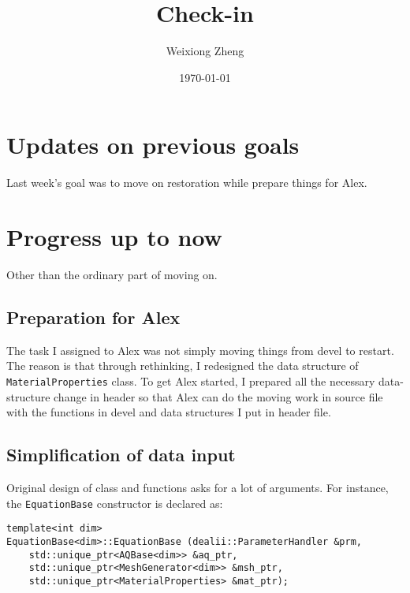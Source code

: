 \documentclass{article}
\title{Check-in} %
\author{Weixiong Zheng} %
\date{\today} %
\begin{document}
\maketitle %

\section{Updates on previous goals}
Last week's goal was to move on restoration while prepare things for Alex.
\section{Progress up to now}
Other than the ordinary part of moving on.

\subsection{Preparation for Alex}
The task I assigned to Alex was not simply moving things from devel to restart. The reason
is that through rethinking, I redesigned the data structure of {\tt MaterialProperties} class.
To get Alex started, I prepared all the necessary data-structure change in header so that
Alex can do the moving work in source file with the functions in devel and data structures
I put in header file.

\subsection{Simplification of data input}
Original design of class and functions asks for a lot of arguments. For instance, the
{\tt EquationBase} constructor is declared as:
\begin{verbatim}
template<int dim>
EquationBase<dim>::EquationBase (dealii::ParameterHandler &prm, 
    std::unique_ptr<AQBase<dim>> &aq_ptr,
    std::unique_ptr<MeshGenerator<dim>> &msh_ptr,
    std::unique_ptr<MaterialProperties> &mat_ptr);
\end{verbatim}
\end{document}
